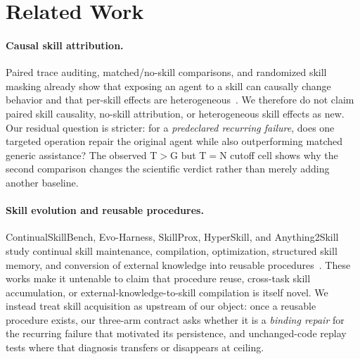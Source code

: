 \section{Related Work}
\label{sec:related}
\paragraph{Causal skill attribution.}
Paired trace auditing, matched/no-skill comparisons, and randomized skill masking already show that exposing an agent to a skill can causally change behavior and that per-skill effects are heterogeneous~\citep{zhou2026counterfactual,dong2026agentskills,wang2026notallskills}. We therefore do not claim paired skill causality, no-skill attribution, or heterogeneous skill effects as new. Our residual question is stricter: for a \emph{predeclared recurring failure}, does one targeted operation repair the original agent while also outperforming matched generic assistance? The observed T$>$G but T$=$N cutoff cell shows why the second comparison changes the scientific verdict rather than merely adding another baseline.

\paragraph{Skill evolution and reusable procedures.}
ContinualSkillBench, Evo-Harness, SkillProx, HyperSkill, and Anything2Skill study continual skill maintenance, compilation, optimization, structured skill memory, and conversion of external knowledge into reusable procedures~\citep{guan2026continualskillbench,wei2026evoharness,zheng2026skillprox,xu2026hyperskill,pan2026anything2skill}. These works make it untenable to claim that procedure reuse, cross-task skill accumulation, or external-knowledge-to-skill compilation is itself novel. We instead treat skill acquisition as upstream of our object: once a reusable procedure exists, our three-arm contract asks whether it is a \emph{binding repair} for the recurring failure that motivated its persistence, and unchanged-code replay tests where that diagnosis transfers or disappears at ceiling.


